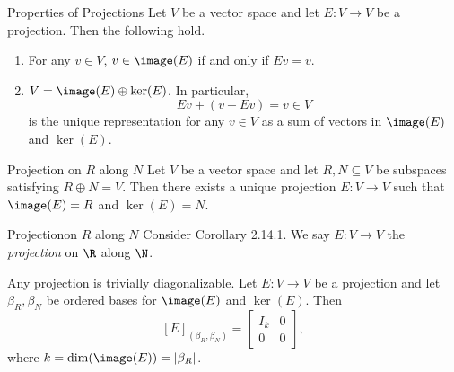 \documentclass[linearalgebraII]{subfiles}
\begin{document}
    \begin{prop}{Properties of Projections}
        Let $V$ be a vector space and let $E: V\to V$ be a projection. Then the following hold.
        \begin{enumerate}
            \item For any $v\in V$, $v\in \image(E)$ if and only if $Ev = v$.
            \item $V = \image(E)\oplus \ker(E)$. In particular,
                \begin{equation*}
                    Ev + (v-Ev) = v\in V
                \end{equation*}
                is the unique representation for any $v\in V$ as a sum of vectors in $\image(E)$ and $\ker(E)$.
        \end{enumerate}
    \end{prop}

    \begin{cor}{Projection on $R$ along $N$}
        Let $V$ be a vector space and let $R, N\subseteq V$ be subspaces satisfying $R\oplus N = V$. Then there exists a unique projection $E:V\to V$ such that $\image(E) = R$ and $\ker(E) = N$.
    \end{cor}	

    \begin{definition}{Projection}{on $R$ along $N$}
        Consider Corollary 2.14.1. We say $E:V\to V$ the \emph{projection} on $\R$ along $\N$.
    \end{definition}

    \begin{remark}
        Any projection is trivially diagonalizable. Let $E: V\to V$ be a projection and let $\beta_R,\beta_N$ be ordered bases for $\image(E)$ and $\ker(E)$. Then
        \begin{equation*}
            \left[ E \right]_{\left( \beta_R, \beta_N \right)} = \begin{bmatrix} I_k & 0 \\ 0 & 0 \end{bmatrix},
        \end{equation*}
        where $k = \dim(\image(E)) = \left| \beta_R \right|$.
    \end{remark}
\end{document}
